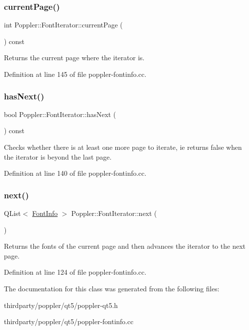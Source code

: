 \subsubsection{\texorpdfstring{current\+Page()}{currentPage()}}
{\footnotesize\ttfamily int Poppler\+::\+Font\+Iterator\+::current\+Page (\begin{DoxyParamCaption}{ }\end{DoxyParamCaption}) const}

Returns the current page where the iterator is. 

Definition at line 145 of file poppler-\/fontinfo.\+cc.

\mbox{\label{class_poppler_1_1_font_iterator_a7a3dde96c97c99d1997429e85a4d8451}} 
\subsubsection{\texorpdfstring{has\+Next()}{hasNext()}}
{\footnotesize\ttfamily bool Poppler\+::\+Font\+Iterator\+::has\+Next (\begin{DoxyParamCaption}{ }\end{DoxyParamCaption}) const}

Checks whether there is at least one more page to iterate, ie returns false when the iterator is beyond the last page. 

Definition at line 140 of file poppler-\/fontinfo.\+cc.

\mbox{\label{class_poppler_1_1_font_iterator_ab33e290dff2467cda4c9ce87a6c5398e}} 
\subsubsection{\texorpdfstring{next()}{next()}}
{\footnotesize\ttfamily Q\+List$<$ \hyperlink{class_poppler_1_1_font_info}{Font\+Info} $>$ Poppler\+::\+Font\+Iterator\+::next (\begin{DoxyParamCaption}{ }\end{DoxyParamCaption})}

Returns the fonts of the current page and then advances the iterator to the next page. 

Definition at line 124 of file poppler-\/fontinfo.\+cc.



The documentation for this class was generated from the following files\+:\begin{DoxyCompactItemize}
\item 
thirdparty/poppler/qt5/poppler-\/qt5.\+h\item 
thirdparty/poppler/qt5/poppler-\/fontinfo.\+cc\end{DoxyCompactItemize}
